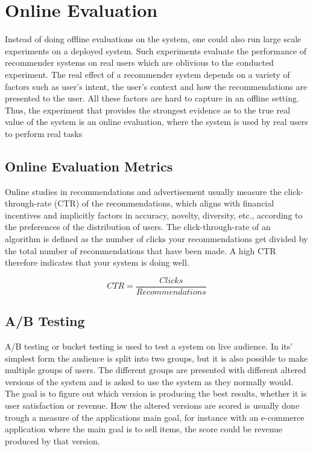 
\section{Online Evaluation}

Instead of doing offline evaluations on the system, one could also run large
scale experiments on a deployed system. Such experiments evaluate the
performance of recommender systems on real users which are oblivious to the
conducted experiment. The real effect of a recommender system depends on a
variety of factors such as user’s intent, the user’s context and how the
recommendations are presented to the user. All these factors are hard to
capture in an offline setting. Thus, the experiment that provides the strongest
evidence as to the true real value of the system is an online evaluation, where
the system is used by real users to perform real tasks

\subsection{Online Evaluation Metrics}

Online studies in recommendations and advertisement usually measure the
click-through-rate (CTR) of the recommendations, which aligns with financial
incentives and implicitly factors in accuracy, novelty, diversity, etc.,
according to the preferences of the distribution of users.  The
click-through-rate of an algorithm is defined as the number of clicks your
recommendations get divided by the total number of recommendations that have
been made. A high CTR therefore indicates that your system is doing well.

\begin{equation}
CTR = \frac{Clicks}{Recommendations}
\end{equation}

\subsection{A/B Testing}
	A/B testing or bucket testing is used to test a system on live audience.
	In its' simplest form the audience is split into two groups, but it is also possible to make multiple groups of users.
	The different groups are presented with different altered versions of the system and is asked to use the system as they normally would.
	The goal is to figure out which version is producing the best results, whether it is user satisfaction or revenue.
	How the altered versions are scored is usually done trough a measure of the applications main goal, for instance with an e-commerce application where the main goal is to sell items, the score could be revenue produced by that version.

